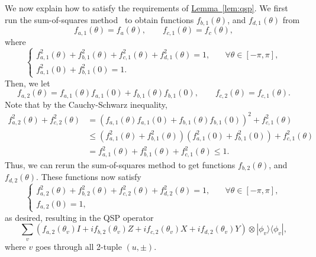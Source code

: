 \documentclass[letterpaper,onecolumn,11pt,accepted=2026-02-14]{quantumarticle}
\theoremstyle{remark}
\theoremstyle{plain}
\newcommand{\lem}[1]{\hyperref[lem:#1]{Lemma~\ref*{lem:#1}}}
\newcommand{\ket}[1]{|#1\rangle}
\newcommand{\bra}[1]{\langle#1|}
\newcommand{\ketbra}[2]{\ket{#1}\!\bra{#2}}
\begin{document}
We now explain how to satisfy the requirements of \lem{qsp}.
We first run the sum-of-squares method~\cite{MethodologyLYC} to obtain functions $f_{b,1}(\theta)$, and $f_{d,1}(\theta)$ from
\begin{equation}
    f_{a,1}(\theta)=f_a(\theta),\qquad
    f_{c,1}(\theta)=f_c(\theta),
\end{equation}
where
\begin{equation}
\begin{cases}
    f_{a,1}^2(\theta)+f_{b,1}^2(\theta)+f_{c,1}^2(\theta)+f_{d,1}^2(\theta)=1,\quad &\forall \theta\in[-\pi,\pi],\\
    f_{a,1}^2(0)+f_{b,1}^2(0)=1.
\end{cases}
\end{equation}
Then, we let
\begin{equation}
    f_{a,2}(\theta)=f_{a,1}(\theta)f_{a,1}(0)+f_{b,1}(\theta)f_{b,1}(0),\qquad
    f_{c,2}(\theta)=f_{c,1}(\theta).
\end{equation}
Note that by the Cauchy-Schwarz inequality,
\begin{equation}
\begin{aligned}
    f_{a,2}^2(\theta)+f_{c,2}^2(\theta)
    &=\left(f_{a,1}(\theta)f_{a,1}(0)+f_{b,1}(\theta)f_{b,1}(0)\right)^2+f_{c,1}^2(\theta)\\
    &\leq\left(f_{a,1}^2(\theta)+f_{b,1}^2(\theta)\right)\left(f_{a,1}^2(0)+f_{b,1}^2(0)\right)+f_{c,1}^2(\theta)\\
    &=f_{a,1}^2(\theta)+f_{b,1}^2(\theta)+f_{c,1}^2(\theta)\leq1.
\end{aligned}
\end{equation}
Thus, we can rerun the sum-of-squares method to get functions $f_{b,2}(\theta)$, and $f_{d,2}(\theta)$. These functions now satisfy
\begin{equation}
\begin{cases}
    f_{a,2}^2(\theta)+f_{b,2}^2(\theta)+f_{c,2}^2(\theta)+f_{d,2}^2(\theta)=1,\quad &\forall \theta\in[-\pi,\pi],\\
    f_{a,2}(0)=1,
\end{cases}
\end{equation}
as desired, resulting in the QSP operator
\begin{equation}
    \sum_v \left(f_{a,2}(\theta_v)I+if_{b,2}(\theta_v)Z+if_{c,2}(\theta_v)X+if_{d,2}(\theta_v)Y\right)\otimes\ketbra{\phi_v}{\phi_v},
\end{equation}
where $v$ goes through all 2-tuple $(u,\pm)$.
\end{document}
